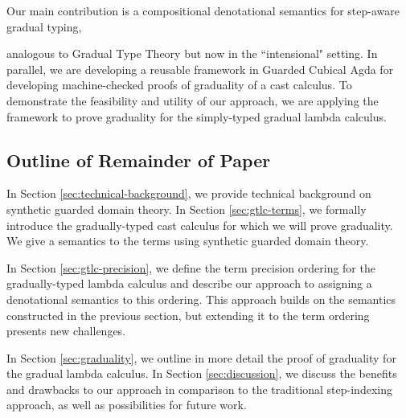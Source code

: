 Our main contribution is a compositional denotational semantics for step-aware gradual typing,

analogous to Gradual Type Theory but now in the ``intensional" setting.
In parallel, we are developing a reusable framework in
Guarded Cubical Agda for developing machine-checked proofs of graduality of a cast calculus.
To demonstrate the feasibility and utility of our approach, we are applying the framework
to prove graduality for the simply-typed gradual lambda calculus.


\subsection{Outline of Remainder of Paper}


%
In Section \ref{sec:technical-background}, we provide technical background on synthetic guarded domain theory.
% 
In Section \ref{sec:gtlc-terms}, we formally introduce the gradually-typed cast calculus
for which we will prove graduality. We give a semantics to the terms using
synthetic guarded domain theory.
%

In Section \ref{sec:gtlc-precision}, we define the term precision ordering for
the gradually-typed lambda calculus and describe our approach to assigning a
denotational semantics to this ordering.
This approach builds on the semantics constructed in the previous section,
but extending it to the term ordering presents new challenges.


%
%
In Section \ref{sec:graduality}, we outline in more detail the proof of graduality for the
gradual lambda calculus.
%
In Section \ref{sec:discussion}, we discuss the benefits and drawbacks to our approach in comparison
to the traditional step-indexing approach, as well as possibilities for future work.

